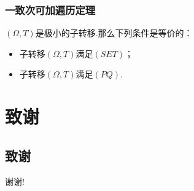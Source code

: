 \documentclass[compress,red]{beamer}
\begin{document}
\begin{frame}
\begin{theorem}
\frametitle{一致次可加遍历定理}
$(\Omega,T)$是极小的子转移.那么下列条件是等价的：
\begin{itemize}
\item 子转移$(\Omega,T)$满足$(SET)$；
\item 子转移$(\Omega,T)$满足$(PQ)$.
\end{itemize}
\end{theorem}
\end{frame}

\section*{致谢}
\subsection*{致谢}
\begin{frame}
\begin{center}
\huge {谢谢!} 
\end{center}
\end{frame}
\end{document}
